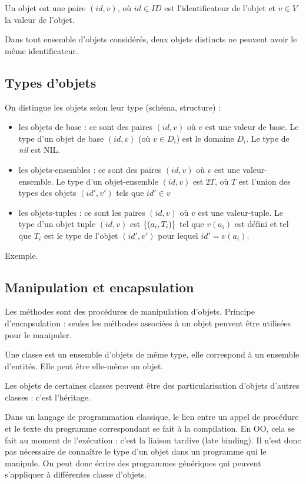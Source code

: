 	Un objet est une paire $(id, v)$, où $id \in ID$ est l'identificateur de l'objet et $v \in V$ la valeur de l'objet.
	
	Dans tout ensemble d'objets considérés, deux objets distincts ne peuvent avoir le même identificateur.
	
		\subsection{Types d'objets}
		
		On distingue les objets selon leur type (schéma, structure) :
		
		\begin{itemize}
			\item les objets de base : ce sont des paires $(id, v)$ où $v$ est une valeur de base. Le type d'un objet de base $(id, v)$ (où $v \in D_i$) est le domaine $D_i$. Le type de \textit{nil} est NIL.
			\item les objets-ensembles : ce sont des paires $(id, v)$ où $v$ est une valeur-ensemble. Le type d'un objet-ensemble $(id, v)$ est $2T$, où $T$ est l'union des types des objets $(id', v')$ tels que $id' \in v$
			\item les objets-tuples : ce sont les paires $(id, v)$ où $v$ est une valeur-tuple. Le type d'un objet tuple $(id, v)$ est $\lbrace (a_i, T_i) \rbrace$ tel que $v(a_i)$ est défini et tel que $T_i$ est le type de l'objet $(id', v')$ pour lequel $id' = v(a_i)$.
		\end{itemize}
		
		Exemple.
		
		
		\subsection{Manipulation et encapsulation}
		
		Les méthodes sont des procédures de manipulation d'objets. Principe d'encapsulation : seules les méthodes associées à un objet peuvent être utilisées pour le manipuler.
		
		Une classe est un ensemble d'objets de même type, elle correspond à un ensemble d'entités. Elle peut être elle-même un objet.
		
		Les objets de certaines classes peuvent être des particularisation d'objets d'autres classes : c'est l'héritage.
		
		Dans un langage de programmation classique, le lien entre un appel de procédure et le texte du programme correspondant se fait à la compilation. En OO, cela se fait au moment de l'exécution : c'est la liaison tardive (late binding). Il n'est donc pas nécessaire de connaître le type d'un objet dans un programme qui le manipule. On peut donc écrire des programmes génériques qui peuvent s'appliquer à différentes classe d'objets.
		
